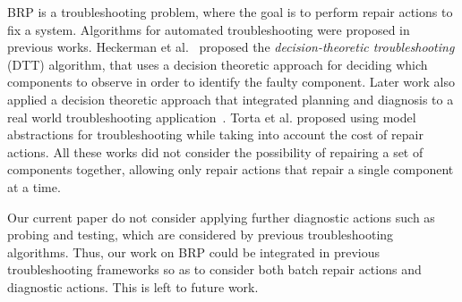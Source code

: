 \documentclass[letterpaper]{article}
\begin{document}
BRP is a troubleshooting problem, where the goal is to perform repair actions to fix a system. Algorithms for automated troubleshooting were proposed in previous works. Heckerman et al.~ proposed the {\em decision-theoretic troubleshooting} (DTT) algorithm, that uses a decision theoretic approach for deciding which components to observe in order to identify the faulty component. Later work also applied a decision theoretic approach that integrated planning and diagnosis to a real world troubleshooting application~\cite{Nyberg12,warnquist2009planning}. Torta et al.  proposed using model abstractions for troubleshooting while taking into account the cost of repair actions. All these works did not consider the possibility of repairing a set of components together, allowing only repair actions that repair a single component at a time.

Our current paper do not consider applying further diagnostic actions such as probing and testing, which are considered by previous troubleshooting algorithms. Thus, our work on BRP could be integrated in previous troubleshooting frameworks so as to consider both batch repair actions and diagnostic actions. This is left to future work.

\end{document}
